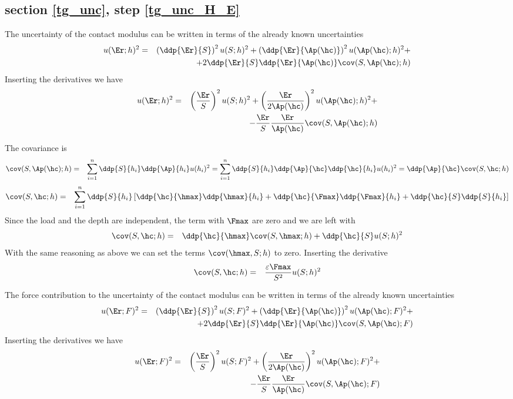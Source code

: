 \subsection{section \ref{tg_unc}, step \ref{tg_unc_H_E}}
The uncertainty of the contact modulus can be written in terms of the already known uncertainties
\begin{eqnarray*}
 u(\Er;h)^2 &=& 
 \left( \ddp{ \Er}{ S}\right)^2 u(S;h)^2 + 
 \left( \ddp{ \Er}{ \Ap(\hc)} \right)^2 u(\Ap(\hc);h)^2 + \\ 
  && + 2  \ddp{ \Er}{ S}\ddp{ \Er}{ \Ap(\hc)} \cov(S,\Ap(\hc);h)  
\end{eqnarray*}
Inserting the derivatives we have
\begin{eqnarray*}
u(\Er;h)^2 &=& 
 \left( \frac{ \Er}{ S}\right)^2 u(S;h)^2 + 
 \left( \frac{ \Er}{ 2\Ap(\hc)} \right)^2 u(\Ap(\hc);h)^2 + \\ 
  && -  \frac{ \Er}{ S}\frac{ \Er}{ \Ap(\hc)} \cov(S,\Ap(\hc);h)   
\end{eqnarray*}

The covariance is
\begin{eqnarray*}
 \cov(S,\Ap(\hc);h) & =& \sum_{i=1}^n \ddp{ S}{ h_i} \ddp{ \Ap}{ h_i} u(h_i)^2 =  \sum_{i=1}^n \ddp{ S}{ h_i} \ddp{ \Ap}{ \hc} \ddp{\hc}{h_i} u(h_i)^2 = \ddp{\Ap}{\hc} \cov(S,\hc;h)
 \end{eqnarray*}
 \begin{eqnarray*}
\cov(S,\hc;h)  &=& \sum_{i=1}^n
  \ddp{ S }{ h_i}  
  \left[
  \ddp{ \hc }{\hmax} \ddp{ \hmax}{ h_i} + 
  \ddp{ \hc }{\Fmax} \ddp{ \Fmax}{ h_i} + 
  \ddp{ \hc }{ S} \ddp{ S}{ h_i} 
  \right]
  \end{eqnarray*}
Since the load and the depth are independent, the term with $\Fmax$ are zero and we are left with
\begin{eqnarray*}
  \cov(S,\hc;h) &=& \ddp{ \hc }{\hmax} \cov(S,\hmax;h) + \ddp{\hc}{S} u(S;h)^2 
\end{eqnarray*}
With the same reasoning as above we can set the terms $\cov(\hmax,S;h)$ to zero. Inserting the derivative
\begin{eqnarray*}
  \cov(S,\hc;h) &=& \frac{\varepsilon \Fmax}{S^2} u(S;h)^2 
\end{eqnarray*}


The force contribution to the uncertainty of the contact modulus can be written in terms of the already known uncertainties
\begin{eqnarray*}
 u(\Er;F)^2 &=& 
 \left( \ddp{ \Er}{ S}\right)^2 u(S;F)^2 + 
 \left( \ddp{ \Er}{ \Ap(\hc)} \right)^2 u(\Ap(\hc);F)^2 + \\ 
  && + 2  \ddp{ \Er}{ S}\ddp{ \Er}{ \Ap(\hc)} \cov(S,\Ap(\hc);F)  
\end{eqnarray*}
Inserting the derivatives we have
\begin{eqnarray*}
u(\Er;F)^2 &=& 
 \left( \frac{ \Er}{ S}\right)^2 u(S;F)^2 + 
 \left( \frac{ \Er}{ 2\Ap(\hc)} \right)^2 u(\Ap(\hc);F)^2 + \\ 
  && -  \frac{ \Er}{ S}\frac{ \Er}{ \Ap(\hc)} \cov(S,\Ap(\hc);F)   
\end{eqnarray*}

